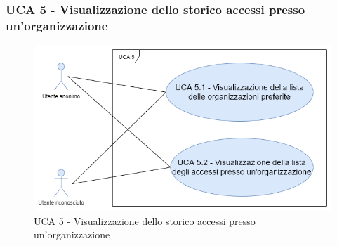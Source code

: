 \newpage


\subsubsection{UCA 5 - Visualizzazione dello storico accessi presso un'organizzazione}
\begin{figure}[h]
	\centering	
	\includegraphics[scale=0.5]{sezioni/UseCase/Immagini/UCA5.png}
	\caption{UCA 5 - Visualizzazione dello storico accessi presso un'organizzazione}
\end{figure}

